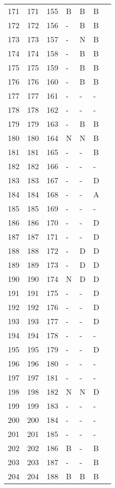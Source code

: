 \begin{longtable}{rrrllll}
  171 & 171 & 155 & B & B & B &  \\ 
  172 & 172 & 156 & - & B & B &  \\ 
  173 & 173 & 157 & - & N & B &  \\ 
  174 & 174 & 158 & - & B & B &  \\ 
  175 & 175 & 159 & - & B & B &  \\ 
  176 & 176 & 160 & - & B & B &  \\ 
  177 & 177 & 161 & - & - & - &  \\ 
  178 & 178 & 162 & - & - & - &  \\ 
  179 & 179 & 163 & - & B & B &  \\ 
  180 & 180 & 164 & N & N & B &  \\ 
  181 & 181 & 165 & - & - & B &  \\ 
  182 & 182 & 166 & - & - & - &  \\ 
  183 & 183 & 167 & - & - & D &  \\ 
  184 & 184 & 168 & - & - & A &  \\ 
  185 & 185 & 169 & - & - & - &  \\ 
  186 & 186 & 170 & - & - & D &  \\ 
  187 & 187 & 171 & - & - & D &  \\ 
  188 & 188 & 172 & - & D & D &  \\ 
  189 & 189 & 173 & - & D & D &  \\ 
  190 & 190 & 174 & N & D & D &  \\ 
  191 & 191 & 175 & - & - & D &  \\ 
  192 & 192 & 176 & - & - & D &  \\ 
  193 & 193 & 177 & - & - & D &  \\ 
  194 & 194 & 178 & - & - & - &  \\ 
  195 & 195 & 179 & - & - & D &  \\ 
  196 & 196 & 180 & - & - & - &  \\ 
  197 & 197 & 181 & - & - & - &  \\ 
  198 & 198 & 182 & N & N & D &  \\ 
  199 & 199 & 183 & - & - & - &  \\ 
  200 & 200 & 184 & - & - & - &  \\ 
  201 & 201 & 185 & - & - & - &  \\ 
  202 & 202 & 186 & B & - & B &  \\ 
  203 & 203 & 187 & - & - & B &  \\ 
  204 & 204 & 188 & B & B & B &  \\ 

\end{longtable}
